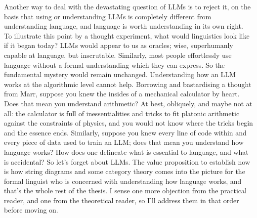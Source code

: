 Another way to deal with the devastating question of LLMs is to reject it, on the basis that using or understanding LLMs is completely different from understanding language, and language is worth understanding in its own right. To illustrate this point by a thought experiment, what would linguistics look like if it began today? LLMs would appear to us as oracles; wise, superhumanly capable at language, but inscrutable. Similarly, most people effortlessly use language without a formal understanding which they can express. So the fundamental mystery would remain unchanged. Understanding how an LLM works at the algorithmic level cannot help. Borrowing and bastardising a thought from Marr, suppose you knew the insides of a mechanical calculator by heart. Does that mean you understand arithmetic? At best, obliquely, and maybe not at all: the calculator is full of inessentialities and tricks to fit platonic arithmetic against the constraints of physics, and you would not know where the tricks begin and the essence ends. Similarly, suppose you knew every line of code within and every piece of data used to train an LLM; does that mean you understand how language works? How does one delineate what is essential to language, and what is accidental? So let's forget about LLMs. The value proposition to establish now is how string diagrams and some category theory comes into the picture for the formal linguist who is concerned with understanding how language works, and that's the whole rest of the thesis. I sense one more objection from the practical reader, and one from the theoretical reader, so I'll address them in that order before moving on.

